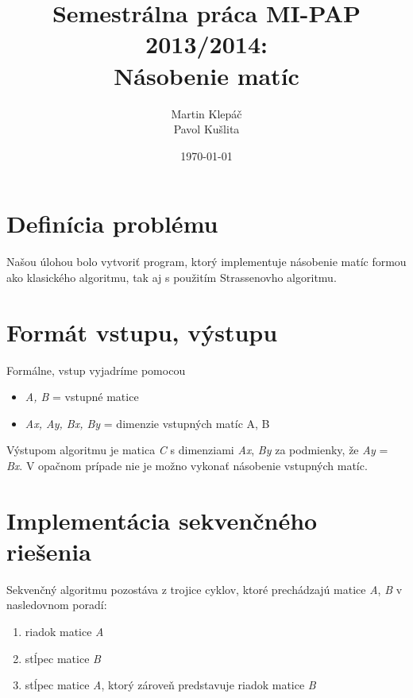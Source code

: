 \documentclass[slovak]{article}
\begin{document}
\title{Semestrálna práca MI-PAP 2013/2014: \\[5mm] Násobenie matíc}
\author{Martin Klepáč \\[2mm]Pavol Kušlita}
\date{\today}

\maketitle

\section{Definícia problému}

Našou úlohou bolo vytvoriť program, ktorý implementuje násobenie matíc formou ako klasického algoritmu, tak aj s použitím Strassenovho algoritmu. 

\section{Formát vstupu, výstupu}

Formálne, vstup vyjadríme pomocou

\begin{itemize}

\item \emph{A, B} = vstupné matice

\item \emph{Ax, Ay, Bx, By} = dimenzie vstupných matíc A, B

\end{itemize}

Výstupom algoritmu je matica \emph{C} s dimenziami \emph{Ax}, \emph{By} za podmienky, že \emph{Ay} = \emph{Bx}. V opačnom prípade nie je možno vykonať násobenie vstupných matíc.


\section{Implementácia sekvenčného riešenia}

Sekvenčný algoritmu pozostáva z trojice cyklov, ktoré prechádzajú matice \emph{A}, \emph{B} v nasledovnom poradí:

\begin{enumerate}

\item riadok matice \emph{A}

\item stĺpec matice \emph{B}

\item stĺpec matice \emph{A}, ktorý zároveň predstavuje riadok matice \emph{B}

\end{enumerate}
\end{document}
